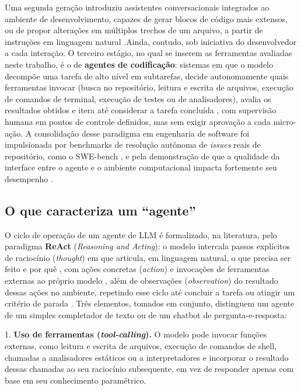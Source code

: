 Uma segunda geração introduziu assistentes conversacionais integrados ao ambiente de desenvolvimento, capazes de gerar blocos de código mais extensos, ou de propor alterações em múltiplos trechos de um arquivo, a partir de instruções em linguagem natural .Ainda, contudo, sob iniciativa do desenvolvedor a cada interação. O terceiro estágio, no qual se inserem as ferramentas avaliadas neste trabalho, é o de \textbf{agentes de codificação}: sistemas em que o modelo decompõe uma tarefa de alto nível em subtarefas, decide autonomamente quais ferramentas invocar (busca no repositório, leitura e escrita de arquivos, execução de comandos de terminal, execução de testes ou de analisadores), avalia os resultados obtidos e itera até considerar a tarefa concluída , com supervisão humana em pontos de controle definidos, mas sem exigir aprovação a cada micro-ação. A consolidação desse paradigma em engenharia de software foi impulsionada por benchmarks de resolução autônoma de \textit{issues} reais de repositório, como o SWE-bench \cite{Jimenez2024SWEbench}, e pela demonstração de que a qualidade da interface entre o agente e o ambiente computacional impacta fortemente seu desempenho \cite{Yang2024SWEagent}.


\subsection{O que caracteriza um ``agente''}\label{subsec:caracterizacao-agente}
O ciclo de operação de um agente de LLM é formalizado, na literatura, pelo paradigma \textbf{ReAct} (\textit{Reasoning and Acting}): o modelo intercala passos explícitos de raciocínio (\textit{thought})  em que articula, em linguagem natural, o que precisa ser feito e por quê , com ações concretas (\textit{action}) e invocações de ferramentas externas ao próprio modelo , além de observações (\textit{observation}) do resultado dessas ações no ambiente, repetindo esse ciclo até concluir a tarefa ou atingir um critério de parada \cite{Yao2023ReAct}. Três elementos, tomados em conjunto, distinguem um agente de um simples completador de texto ou de um chatbot de pergunta-e-resposta:

1. \textbf{Uso de ferramentas (\textit{tool-calling}).} O modelo pode invocar funções externas, como leitura e escrita de arquivos, execução de comandos de shell, chamadas a analisadores estáticos ou a interpretadores  e incorporar o resultado dessas chamadas ao seu raciocínio subsequente, em vez de responder apenas com base em seu conhecimento paramétrico.


